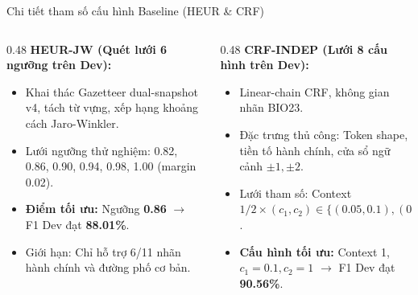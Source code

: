 \documentclass[aspectratio=169, 9pt]{beamer}
\begin{document}
\begin{frame}{Chi tiết tham số cấu hình Baseline (HEUR \& CRF)}
  \vspace{-0.15cm}
  \begin{columns}[T]
    \begin{column}{0.48\textwidth}
      \textbf{HEUR-JW (Quét lưới 6 ngưỡng trên Dev):}
      \begin{itemize}
        \setlength{\itemsep}{2pt}
        \item Khai thác Gazetteer dual-snapshot v4, tách từ vựng, xếp hạng khoảng cách Jaro-Winkler.
        \item Lưới ngưỡng thử nghiệm: 0.82, 0.86, 0.90, 0.94, 0.98, 1.00 (margin 0.02).
        \item \textbf{Điểm tối ưu:} Ngưỡng \textbf{0.86} $\to$ F1 Dev đạt \textbf{88.01\%}.
        \item Giới hạn: Chỉ hỗ trợ 6/11 nhãn hành chính và đường phố cơ bản.
      \end{itemize}
    \end{column}
    \begin{column}{0.48\textwidth}
      \textbf{CRF-INDEP (Lưới 8 cấu hình trên Dev):}
      \begin{itemize}
        \setlength{\itemsep}{2pt}
        \item Linear-chain CRF, không gian nhãn BIO23.
        \item Đặc trưng thủ công: Token shape, tiền tố hành chính, cửa sổ ngữ cảnh $\pm 1, \pm 2$.
        \item Lưới tham số: Context $1/2 \times (c_1, c_2) \in \{(0.05, 0.1), (0.1, 0.1), (0.1, 1), (0.5, 1)\}$.
        \item \textbf{Cấu hình tối ưu:} Context 1, $c_1=0.1, c_2=1$ $\to$ F1 Dev đạt \textbf{90.56\%}.
      \end{itemize}
    \end{column}
  \end{columns}
\end{frame}
\end{document}
